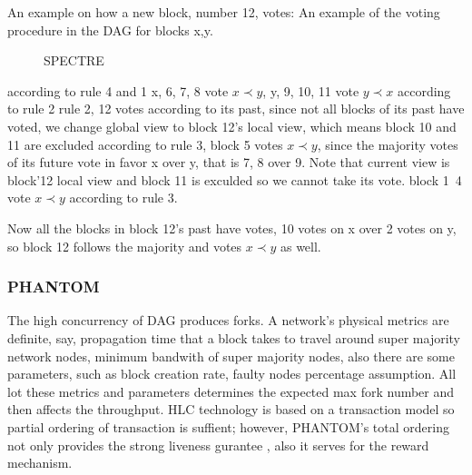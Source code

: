 \documentclass[a4paper,11pt]{article}
\begin{document}
An example on how a new block, number 12, votes: An example of the voting procedure in the DAG for blocks x,y.

\clearpage

\begin{figure}[h]
	\centerline{%
	}
\caption{SPECTRE}
\end{figure}

according to rule 4 and 1 x, 6, 7, 8 vote $x \prec y$, y, 9, 10, 11 vote $y \prec x$ according to rule 2 rule 2, 12 votes according to its past, since not all blocks of its past have voted, we change global view to block 12's local view, which means block 10 and 11 are excluded according to rule 3, block 5 votes $x \prec y$, since the majority votes of its future vote in favor x over y, that is 7, 8 over 9. Note that current view is block'12 local view and block 11 is exculded so we cannot take its vote. block 1~4 vote $x \prec y$ according to rule 3.

Now all the blocks in block 12's past have votes, 10 votes on x over 2 votes on y, so block 12 follows the majority and votes $x \prec y$ as well.


\subsubsection*{PHANTOM}
The high concurrency of DAG produces forks. A network's physical metrics are definite, say, propagation time that a block takes to travel around super majority network nodes, minimum bandwith of super majority nodes, also there are some parameters, such as block creation rate, faulty nodes percentage assumption. All lot these metrics and parameters determines the expected max fork number and then affects the throughput. HLC technology is based on a transaction model so partial ordering of transaction is suffient; however, PHANTOM's total ordering not only provides the strong liveness gurantee , also it serves for the reward mechanism.
\end{document}
